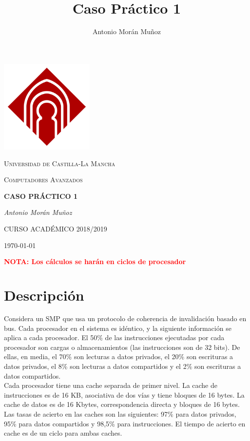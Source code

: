 \documentclass[12pt,a4paper]{article}
\author{Antonio Morán Muñoz}
\title{Caso Práctico 1}
\begin{document}
\begin{titlepage}
\thispagestyle{empty}
\centering
	\includegraphics[width=0.35\textwidth]{castilla.png}\par\vspace{1cm}
	{\scshape\LARGE Universidad de Castilla-La Mancha \par}
	\vspace{1cm}
	{\scshape\Large Computadores Avanzados\par}
	\vspace{1.5cm}
	{\huge\bfseries CASO PRÁCTICO 1\par}
	\vspace{2cm}
	{\Large\itshape Antonio Morán Muñoz\par}

	\vfill

	{CURSO ACADÉMICO 2018/2019}
	\vfill
	{\large \today\par}
\end{titlepage}

\thispagestyle{empty}
\tableofcontents
\newpage

\textbf{\textcolor{red}{NOTA: Los cálculos se harán en ciclos de procesador}}

\section{Descripción}
Considera un SMP que usa un protocolo de coherencia de invalidación basado en bus. Cada procesador en el sistema es idéntico, y la siguiente información se aplica a cada procesador. El 50\% de las instrucciones ejecutadas por cada procesador son cargas o almacenamientos (las instrucciones son de 32 bits). De ellas, en media, el 70\% son lecturas a datos privados, el 20\% son escrituras a datos privados, el 8\% son lecturas a datos compartidos y el 2\% son escrituras a datos compartidos.\\

Cada procesador tiene una cache separada de primer nivel. La cache de instrucciones es de 16 KB, asociativa de dos vías y tiene bloques de 16 bytes. La cache de datos es de 16 Kbytes, correspondencia directa y bloques de 16 bytes. Las tasas de acierto en las caches son las siguientes: 97\% para datos privados, 95\% para datos compartidos y 98,5\% para instrucciones. El tiempo de acierto en cache es de un ciclo para ambas caches.\\
\end{document}
